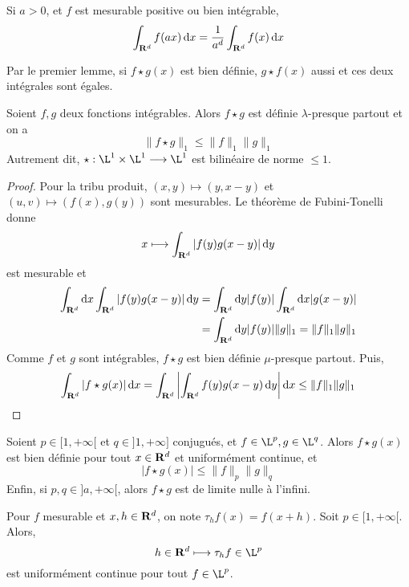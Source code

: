 \begin{lmm}
    Si $a>0$,  et $f$ est mesurable positive ou bien intégrable, \[\int_{\mathbf R^d}f(ax)\mathop{}\!\mathrm d x=\frac1{a^d}\int_{\mathbf R^d}f(x)\mathop{}\!\mathrm d x\]
\end{lmm}

\begin{rem}
    Par le premier lemme, si $f\star g(x)$ est bien définie, $g\star f(x)$ aussi et ces deux intégrales sont égales.
\end{rem}

\begin{thm}
Soient $f, g$ deux fonctions intégrables. Alors  $f\star g$ est définie  $\lambda$-presque partout et on a  \[
\|f\star g\|_1\leq \|f\|_1 \|g\|_1
\] 
Autrement dit, $\star : \L^1\times \L^1 \longrightarrow \L^1$ est bilinéaire de norme $\leq 1$.
\end{thm}

\begin{proof}
    Pour la tribu produit, $(x, y)\mapsto(y, x-y)$ et $(u, v)\mapsto (f(x), g(y))$ sont mesurables. Le théorème de Fubini-Tonelli donne \[x \longmapsto \int_{\mathbf R^d}|f(y)g(x-y)|\mathop{}\!\mathrm d y\] est mesurable et \begin{align*}
    \int_{\mathbf R^d}\mathop{}\!\mathrm d x\int_{\mathbf R^d}|f(y)g(x-y)|\mathop{}\!\mathrm d y&=\int_{\mathbf R^d} \mathop{}\!\mathrm d y|f(y)|\int_{\mathbf R^d} \mathop{}\!\mathrm d x |g(x-y)| \\ &=\int_{\mathbf R^d}\mathop{}\!\mathrm d y |f(y)| \|g\|_1= \|f\|_1 \|g\|_1
\end{align*}
Comme $f$ et  $g$ sont intégrables,  $f\star g$ est bien définie  $\mu$-presque partout. Puis, \[\int_{\mathbf R^d}|f\star g(x)|\mathop{}\!\mathrm d x=\int_{\mathbf R^d}\left|\int_{\mathbf R^d}f(y)g(x-y)\mathop{}\!\mathrm d y\right|\mathop{}\!\mathrm d x\leq \|f\|_1 \|g\|_1\]
\end{proof}

\begin{thm}
    Soient $p \in  [1, +\infty[$ et $q \in  ]1, +\infty]$ conjugués, et $f \in  \L^p, g \in  \L^q$. Alors $f\star g(x)$ est bien définie pour tout  $x \in  \mathbf R^d$ et uniformément continue, et \[|f\star g(x)|\leq \|f\|_p \|g\|_q\]
    Enfin, si $p, q \in  ]a, +\infty[$, alors $f\star g$ est de limite nulle à l'infini.
\end{thm}

\begin{lmm}
    Pour $f $ mesurable et  $x, h \in  \mathbf R^d$, on note $\tau_hf(x)=f(x+h)$. Soit  $p \in  [1, +\infty[$. Alors, \[
    h \in  \R^d \longmapsto \tau_h f \in  \L^p
    \] 
    est uniformément continue pour tout $f \in  \L^p$.
\end{lmm}

